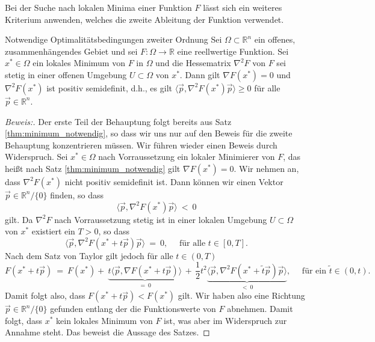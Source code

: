 Bei der Suche nach lokalen Minima einer Funktion $F$ lässt sich ein weiteres Kriterium anwenden, welches die zweite Ableitung der Funktion verwendet.
\begin{theorem}{Notwendige Optimalitätsbedingungen zweiter Ordnung}{}
Sei $\Omega \subset \mathbb{R}^n$ ein offenes, zusammenhängendes Gebiet und sei $F \colon \Omega \rightarrow \mathbb{R}$ eine reellwertige Funktion. 
Sei $x^*\in \Omega$ ein lokales Minimum von $F$ in $\Omega$ und die Hessematrix $\nabla^2 F$ von $F$ sei stetig in einer offenen Umgebung $U \subset \Omega$ von $x^*$. 
Dann gilt $\nabla F(x^*) = 0$ und $\nabla^2 F(x^*)$ ist positiv semidefinit, d.h., es gilt $\langle \vec{p}, \nabla^2F(x^*) \vec{p} \rangle \geq 0$ für alle $\vec{p} \in \mathbb{R}^n$.
\end{theorem}
\begin{proof}[Beweis:]
Der erste Teil der Behauptung folgt bereits aus Satz \ref{thm:minimum_notwendig}, so dass wir uns nur auf den Beweis für die zweite Behauptung konzentrieren müssen. 
Wir führen wieder einen Beweis durch Widerspruch. 
Sei $x^* \in \Omega$ nach Vorraussetzung ein lokaler Minimierer von $F$, das heißt nach Satz \ref{thm:minimum_notwendig} gilt $\nabla F(x^*) = 0$. 
Wir nehmen an, dass $\nabla^2 F(x^*)$ nicht positiv semidefinit ist. 
Dann können wir einen Vektor $\vec{p} \in \mathbb{R}^n / \lbrace 0\rbrace$ finden, so dass
\begin{equation*}
\langle \vec{p}, \nabla^2F(x^*)\vec{p} \rangle \ < \ 0
\end{equation*}
gilt. 
Da $\nabla^2 F$ nach Vorraussetzung stetig ist in einer lokalen Umgebung $U \subset \Omega$ von $x^*$ existiert ein $T > 0$, so dass
\begin{equation*}
\langle \vec{p}, \nabla^2F(x^* + t\vec{p})\vec{p} \rangle \ = \ 0, \quad \text{ für alle } t\in[0,T]. 
\end{equation*}
Nach dem Satz von Taylor gilt jedoch für alle $t \in (0,T)$
\begin{equation*}
F(x^* + t\vec{p}) \ = \ F(x^*) +~\underbrace{t\langle \vec{p}, \nabla F(x^* + t\vec{p}) \rangle}_{=~0} \, + \, \frac{1}{2}t^2\underbrace{\langle \vec{p}, \nabla^2 F(x^* + \tilde{t}\vec{p})\vec{p}\rangle}_{<~0}, \quad \text{ für ein } \tilde{t} \in (0,t).
\end{equation*}
Damit folgt also, dass $F(x^* + t\vec{p}) < F(x^*)$ gilt. Wir haben also eine Richtung $\vec{p} \in \mathbb{R}^n/\lbrace 0 \rbrace$ gefunden entlang der die Funktionswerte von $F$ abnehmen. 
Damit folgt, dass $x^*$ kein lokales Minimum von $F$ ist, was aber im Widerspruch zur Annahme steht. 
Das beweist die Aussage des Satzes.
\end{proof}
